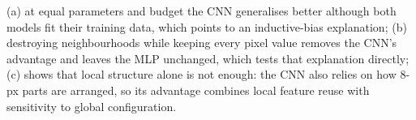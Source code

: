 (a) at equal parameters and budget the CNN generalises better although both models fit their training data, which points to an inductive-bias explanation; (b) destroying neighbourhoods while keeping every pixel value removes the CNN's advantage and leaves the MLP unchanged, which tests that explanation directly; (c) shows that local structure alone is not enough: the CNN also relies on how 8-px parts are arranged, so its advantage combines local feature reuse with sensitivity to global configuration.
